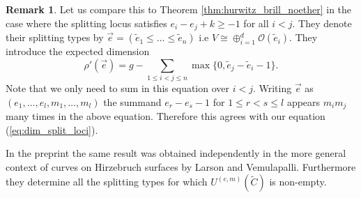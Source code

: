 \documentclass[12pt]{extarticle}
\theoremstyle{definition}
\newtheorem{remark}[theorem]{Remark}
\numberwithin{theorem}{section}
\newcommand{\OO}{\mathcal{O}}
\newcommand{\op}{\operatorname}
\renewcommand{\tilde}{\widetilde}		%
\begin{document}
\begin{remark}\label{remark:larson comparison}
Let us compare this to Theorem \ref{thm:hurwitz_brill_noether} in the case where the splitting locus satisfies $e_i - e_j + k\geq -1$ for all $i < j$. They denote their splitting types by $\vec{e} = (\tilde{e}_1 \leq \ldots \leq \tilde{e}_n)$ i.e $V \cong \oplus_{i=1}^d \OO(\tilde{e}_i)$. They introduce the expected dimension
\begin{equation*}
\rho'(\vec{e}) = g - \sum_{1\leq i < j\leq n}\op{max}\{0,\tilde{e}_j - \tilde{e}_i -1\}.
\end{equation*} 
Note that we only need to sum in this equation over $i < j$. Writing $\vec{e}$ as $(e_1,\ldots,e_l,m_1,\ldots,m_l)$ the summand $e_r - e_s - 1$ for $1 \leq r < s \leq l$ appears $m_im_j$ many times in the above equation. Therefore this agrees with our equation (\ref{eq:dim_split_loci}).

In the preprint \cite{larsonvemulapalli} the same result was obtained independently in the more general context of curves on Hirzebruch surfaces by Larson and Vemulapalli. Furthermore they determine all the splitting types for which $U^{(e,m)}(\tilde{C})$ is non-empty.
\end{remark}
\end{document}
